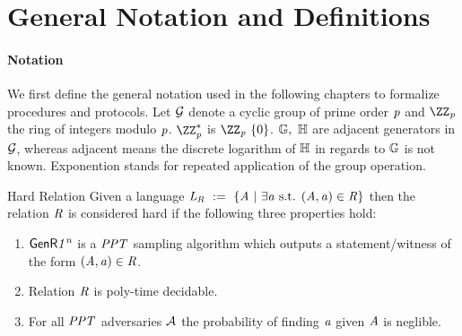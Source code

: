 \section{General Notation and Definitions}\label{sec:generalNotationDefinitions}

\paragraph{Notation}
We first define the general notation used in the following chapters to formalize procedures and protocols. Let $\mathcal{G}$ denote a cyclic group of prime order $\mathit{p}$ and $\cnstIntegersPrime{\varPrime}$
the ring of integers modulo $\mathit{p}$. $\cnstIntegersPrimeWithoutZero{\varPrime}$ is $\cnstIntegersPrime{\varPrime} \opExcluding \funList{0}$. $\mathbb{G} ,~ \mathbb{H}$ are adjacent
generators in $\mathcal{G}$, whereas adjacent means the discrete logarithm of $\mathbb{H}$ in regards to $\mathbb{G}$ is not known. Exponention stands for repeated application of the group operation.

\begin{definition}{Hard Relation}\label{def:hardRelation}
    Given a language $\mathit{L}_{\mathit{R}} ~:=~ \{\mathit{A} ~|~ \exists\mathit{a} \text{ s.t. } (\mathit{A}, \mathit{a}) \in \mathit{R}\}$ then the relation $\mathit{R}$ is
    considered hard if the following three properties hold:~\cite{sanches2020bitcoinchannels}
    \begin{enumerate}
        \item $\mathsf{GenR}{\mathit{1^n}}$ is a $\mathit{PPT}$ sampling algorithm which outputs a statement/witness of the form $(\mathit{A}, \mathit{a}) \in \mathit{R}$.
        \item Relation $\mathit{R}$ is poly-time decidable.
        \item For all $\mathit{PPT}$ adversaries $\mathcal{A}$ the probability of finding $\mathit{a}$ given $\mathit{A}$ is neglible.
    \end{enumerate}
\end{definition}

